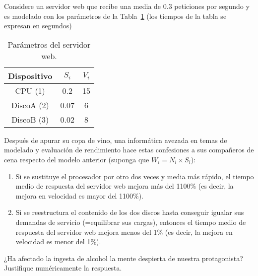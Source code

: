 \begin{ejercicio}\label{ej:5.20}
    Considere un servidor web que recibe una media de 0.3 peticiones por segundo y es modelado con los parámetros de la Tabla~\ref{tab:5.20}
    (los tiempos de la tabla se expresan en segundos)
    \begin{table}[h]
        \centering
        \begin{tabular}{|c|c|c|}
            \hline
            Dispositivo & $S_i$ & $V_i$ \\
            \hline
            CPU (1) & 0.2 & 15 \\
            DiscoA (2) & 0.07 & 6 \\
            DiscoB (3) & 0.02 & 8 \\
            \hline
        \end{tabular}
        \caption{Parámetros del servidor web.}
        \label{tab:5.20}
    \end{table}
    Después de apurar su copa de vino, una informática avezada en temas de modelado y evaluación de rendimiento hace estas confesiones a sus compañeros de cena respecto del modelo anterior (suponga que $W_i = N_i \times S_i$):
    \begin{enumerate}
        \item Si se sustituye el procesador por otro dos veces y media más rápido, el tiempo medio de respuesta del servidor web mejora más del 1100\% (es decir, la mejora en velocidad es mayor del 1100\%).
        \item Si se reestructura el contenido de los dos discos hasta conseguir igualar sus demandas de servicio (=equilibrar sus cargas), entonces el tiempo medio de respuesta del servidor web mejora menos del 1\% (es decir, la mejora en velocidad es menor del 1\%).
    \end{enumerate}
    ¿Ha afectado la ingesta de alcohol la mente despierta de nuestra protagonista? Justifique numéricamente la respuesta.
\end{ejercicio}
\begin{comment}
\solucion
    Las dos predicciones son correctas. En el primer caso la mejora en velocidad obtenida es 12.2 (1120\%) (1114\% si usamos todos los decimales en los cálculos) y en el segundo 1.006 (0.6\%). Las nuevas razones de visita de los discos A y B serían, en el segundo caso, 3.1 y 10.9 respectivamente.
\end{comment}

